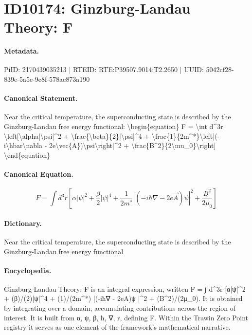 \section*{ID10174: Ginzburg-Landau Theory: F}
\paragraph{Metadata.}
PiID: 2170439035213 | RTEID: RTE:P39507.9014:T2.2650 | UUID: 5042cf28-839e-5a5e-9e8f-578ac873a190

\paragraph{Canonical Statement.}
Near the critical temperature, the superconducting state is described by the Ginzburg-Landau free energy functional: \textbackslash{}begin\{equation\} F = \textbackslash{}int d\textasciicircum{}3r \textbackslash{}left[\textbackslash{}alpha|\textbackslash{}psi|\textasciicircum{}2 + \textbackslash{}frac\{\textbackslash{}beta\}\{2\}|\textbackslash{}psi|\textasciicircum{}4 + \textbackslash{}frac\{1\}\{2m\textasciicircum{}*\}\textbackslash{}left|(-i\textbackslash{}hbar\textbackslash{}nabla - 2e\textbackslash{}vec\{A\})\textbackslash{}psi\textbackslash{}right|\textasciicircum{}2 + \textbackslash{}frac\{B\textasciicircum{}2\}\{2\textbackslash{}mu\_0\}\textbackslash{}right] \textbackslash{}end\{equation\}

\paragraph{Canonical Equation.}
\[
F = \int d^3r \left[\alpha|\psi|^2 + \frac{\beta}{2}|\psi|^4 + \frac{1}{2m^*}\left|(-i\hbar\nabla - 2e\vec{A})\psi\right|^2 + \frac{B^2}{2\mu_0}\right]
\]

\paragraph{Dictionary.}
Near the critical temperature, the superconducting state is described by the Ginzburg-Landau free energy functional

\paragraph{Encyclopedia.}
Ginzburg-Landau Theory: F is an integral expression, written F = ∫ d\textasciicircum{}3r [α|ψ|\textasciicircum{}2 + (β)/(2)|ψ|\textasciicircum{}4 + (1)/(2m\textasciicircum{}*) |(-iħ∇ - 2eA)ψ |\textasciicircum{}2 + (B\textasciicircum{}2)/(2μ\_0). It is obtained by integrating over a domain, accumulating contributions across the region of interest. It is built from α, ψ, β, ħ, ∇, r, defining F. Within the Trawin Zero Point registry it serves as one element of the framework's mathematical narrative.

